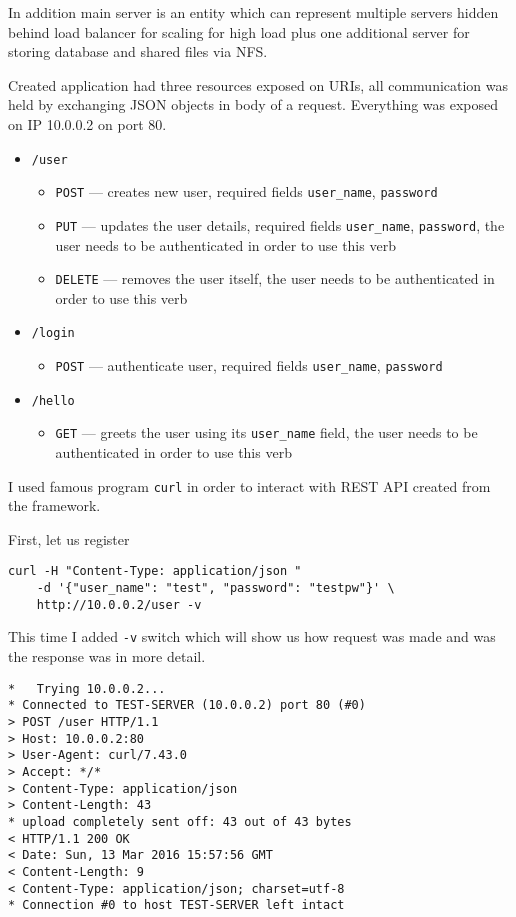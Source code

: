 In addition main server is an entity which can represent multiple servers
hidden behind load balancer for scaling for high load plus one additional
server for storing database and shared files via NFS\@.

Created application had three resources exposed on URIs, all communication was
held by exchanging JSON objects in body of a request. Everything was exposed on
IP 10.0.0.2 on port 80.
\begin{itemize}
    \item \verb|/user|
    \begin{itemize}
        \item \verb|POST| --- creates new user, required fields
          \verb|user_name|, \verb|password|
        \item \verb|PUT| --- updates the user details, required fields
          \verb|user_name|, \verb|password|, the user needs to be authenticated
          in order to use this verb
        \item \verb|DELETE| --- removes the user itself, the user needs to be
          authenticated in order to use this verb
    \end{itemize}
    \item \verb|/login|
    \begin{itemize}
        \item \verb|POST| --- authenticate user, required fields
          \verb|user_name|, \verb|password|
    \end{itemize}
    \item \verb|/hello|
    \begin{itemize}
        \item \verb|GET| --- greets the user using its \verb|user_name| field,
          the user needs to be authenticated in order to use this verb
    \end{itemize}
\end{itemize}

I used famous program \verb|curl| in order to interact with REST API created
from the framework.

First, let us register
\begin{verbatim}
curl -H "Content-Type: application/json "
    -d '{"user_name": "test", "password": "testpw"}' \
    http://10.0.0.2/user -v
\end{verbatim}

This time I added \verb|-v| switch which will show us how request was made and
was the response was in more detail.
\begin{verbatim}
*   Trying 10.0.0.2...
* Connected to TEST-SERVER (10.0.0.2) port 80 (#0)
> POST /user HTTP/1.1
> Host: 10.0.0.2:80
> User-Agent: curl/7.43.0
> Accept: */*
> Content-Type: application/json
> Content-Length: 43
* upload completely sent off: 43 out of 43 bytes
< HTTP/1.1 200 OK
< Date: Sun, 13 Mar 2016 15:57:56 GMT
< Content-Length: 9
< Content-Type: application/json; charset=utf-8
* Connection #0 to host TEST-SERVER left intact
\end{verbatim}

